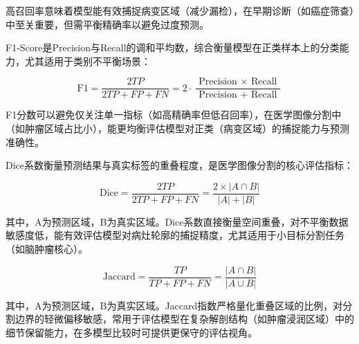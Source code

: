 高召回率意味着模型能有效捕捉病变区域（减少漏检），在早期诊断（如癌症筛查）中至关重要，但需平衡精确率以避免过度预测。

F1-Score是Precision与Recall的调和平均数，综合衡量模型在正类样本上的分类能力，尤其适用于类别不平衡场景：

\begin{equation}
    \mathrm{F} 1=\frac{2 T P}{2 T P+F P+F N}=2 \cdot \frac{\text { Precision } \times \text { Recall }}{\text { Precision }+ \text { Recall }}
\end{equation}

F1分数可以避免仅关注单一指标（如高精确率但低召回率），在医学图像分割中（如肿瘤区域占比小），能更均衡评估模型对正类（病变区域）的捕捉能力与预测准确性。

Dice系数衡量预测结果与真实标签的重叠程度，是医学图像分割的核心评估指标：

\begin{equation}
    \mathrm{Dice}=\frac{2 T P}{2 T P+F P+F N}=\frac{2 \times|A \cap B|}{|A|+|B|}
\end{equation}

其中，A为预测区域，B为真实区域。Dice系数直接衡量空间重叠，对不平衡数据敏感度低，能有效评估模型对病灶轮廓的捕捉精度，尤其适用于小目标分割任务（如脑肿瘤核心）。

\begin{equation}
    \mathrm{Jaccard}=\frac{T P}{T P+F P+F N}=\frac{|A \cap B|}{|A \cup B|}
\end{equation}

其中，A为预测区域，B为真实区域。Jaccard指数严格量化重叠区域的比例，对分割边界的轻微偏移敏感，常用于评估模型在复杂解剖结构（如肿瘤浸润区域）中的细节保留能力，在多模型比较时可提供更保守的评估视角。